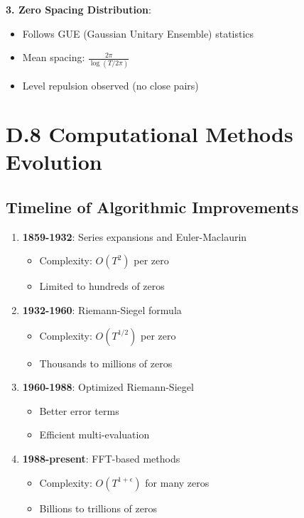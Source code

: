 \textbf{3. Zero Spacing Distribution}:
\begin{itemize}
\item Follows GUE (Gaussian Unitary Ensemble) statistics
\item Mean spacing: $\frac{2\pi}{\log(T/2\pi)}$
\item Level repulsion observed (no close pairs)
\end{itemize}

\section{D.8 Computational Methods Evolution}

\subsection{Timeline of Algorithmic Improvements}

\begin{enumerate}
\item \textbf{1859-1932}: Series expansions and Euler-Maclaurin
   \begin{itemize}
   \item Complexity: $O(T^2)$ per zero
   \item Limited to hundreds of zeros
   \end{itemize}

\item \textbf{1932-1960}: Riemann-Siegel formula
   \begin{itemize}
   \item Complexity: $O(T^{1/2})$ per zero
   \item Thousands to millions of zeros
   \end{itemize}

\item \textbf{1960-1988}: Optimized Riemann-Siegel
   \begin{itemize}
   \item Better error terms
   \item Efficient multi-evaluation
   \end{itemize}

\item \textbf{1988-present}: FFT-based methods
   \begin{itemize}
   \item Complexity: $O(T^{1+\epsilon})$ for many zeros
   \item Billions to trillions of zeros
   \end{itemize}
\end{enumerate}

